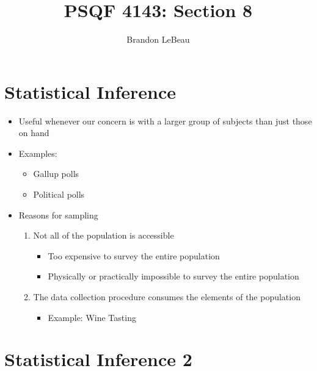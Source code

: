 \documentclass[12pt]{article}
\title{PSQF 4143: Section 8}
\author{Brandon LeBeau}
\date{}
\begin{document}
\maketitle

\section{Statistical Inference}\label{statistical-inference}

\begin{itemize}
\itemsep1pt\parskip0pt
\item
  Useful whenever our concern is with a larger group of subjects than
  just those on hand
\item
  Examples:

  \begin{itemize}
  \itemsep1pt\parskip0pt
  \item
    Gallup polls
  \item
    Political polls
  \end{itemize}
\item
  Reasons for sampling

  \begin{enumerate}
  \def\labelenumi{\arabic{enumi}.}
  \itemsep1pt\parskip0pt
  \item
    Not all of the population is accessible

    \begin{itemize}
    \itemsep1pt\parskip0pt
    \item
      Too expensive to survey the entire population
    \item
      Physically or practically impossible to survey the entire
      population
    \end{itemize}
  \item
    The data collection procedure consumes the elements of the
    population

    \begin{itemize}
    \itemsep1pt\parskip0pt
    \item
      Example: Wine Tasting
    \end{itemize}
  \end{enumerate}
\end{itemize}

\section{Statistical Inference 2}\label{statistical-inference-2}
\end{document}
